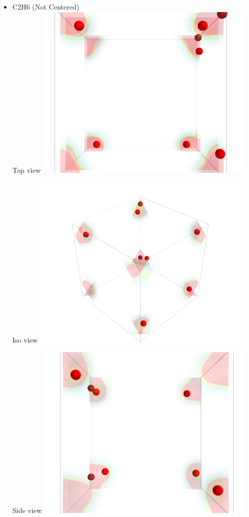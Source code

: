 \documentclass[11pt]{article}
\begin{document}
\begin{itemize}
\item C2H6 (Not Centered)\\
\label{sec-1-6-1-9}%
Top view
\includegraphics[width=.9\linewidth]{./images/C2H6-notCenter_top.png}

Iso view
\includegraphics[width=.9\linewidth]{./images/C2H6-notCenter_iso.png}

Side view
\includegraphics[width=.9\linewidth]{./images/C2H6-notCenter_side.png}


\end{itemize}
\end{document}
